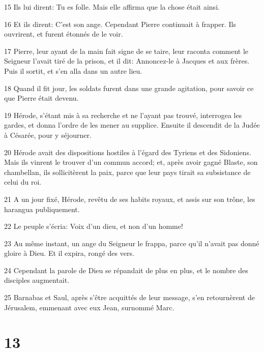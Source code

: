 \par 15 Ils lui dirent: Tu es folle. Mais elle affirma que la chose était ainsi.
\par 16 Et ils dirent: C'est son ange. Cependant Pierre continuait à frapper. Ils ouvrirent, et furent étonnés de le voir.
\par 17 Pierre, leur ayant de la main fait signe de se taire, leur raconta comment le Seigneur l'avait tiré de la prison, et il dit: Annoncez-le à Jacques et aux frères. Puis il sortit, et s'en alla dans un autre lieu.
\par 18 Quand il fit jour, les soldats furent dans une grande agitation, pour savoir ce que Pierre était devenu.
\par 19 Hérode, s'étant mis à sa recherche et ne l'ayant pas trouvé, interrogea les gardes, et donna l'ordre de les mener au supplice. Ensuite il descendit de la Judée à Césarée, pour y séjourner.
\par 20 Hérode avait des dispositions hostiles à l'égard des Tyriens et des Sidoniens. Mais ils vinrent le trouver d'un commun accord; et, après avoir gagné Blaste, son chambellan, ils sollicitèrent la paix, parce que leur pays tirait sa subsistance de celui du roi.
\par 21 A un jour fixé, Hérode, revêtu de ses habits royaux, et assis sur son trône, les harangua publiquement.
\par 22 Le peuple s'écria: Voix d'un dieu, et non d'un homme!
\par 23 Au même instant, un ange du Seigneur le frappa, parce qu'il n'avait pas donné gloire à Dieu. Et il expira, rongé des vers.
\par 24 Cependant la parole de Dieu se répandait de plus en plus, et le nombre des disciples augmentait.
\par 25 Barnabas et Saul, après s'être acquittés de leur message, s'en retournèrent de Jérusalem, emmenant avec eux Jean, surnommé Marc.

\chapter{13}

